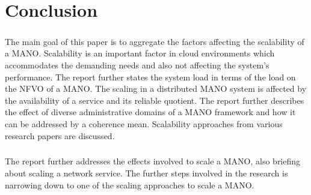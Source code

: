 \chapter{Conclusion}
\label{ch:Conclusion}

\paragraph{}The main goal of this paper is to aggregate the factors affecting the scalability of a MANO. Scalability is an important factor in cloud environments which accommodates the demanding needs and also not affecting the system’s performance. The report further states the system load in terms of the load on the NFVO of a MANO. The scaling in a distributed MANO system is affected by the availability of a service and its reliable quotient. The report further describes the effect of diverse administrative domains of a MANO framework and how it can be addressed by a coherence mean. Scalability approaches from various research papers are discussed.


\paragraph{} The report further addresses the effects involved to scale a MANO, also briefing about scaling a network service. The further steps involved in the research is narrowing down to one of the scaling approaches to scale a MANO.




